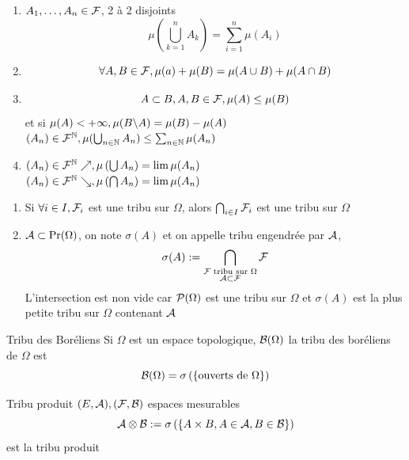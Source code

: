 \documentclass[]{report}
\begin{document}
\begin{prop}{}{}
    \begin{enumerate}[label=\alph*]
        \item $A_1,\ldots,A_n\in \mathcal{F}$, 2 à 2 disjoints
        \[ \mu\left( \bigcup_{k=1}^n A_k\right)= \sum_{i=1}^n \mu (A_i)\]
        \item \[\forall A,B\in \mathcal{F},\mu(a)+\mu(B)=\mu(A\cup B)+ \mu(A\cap B)\]
        \item \[A\subset B, A,B\in \mathcal{F}, \mu(A)\le \mu(B)\]
        et si $\mu(A)<+\infty, \mu(B\backslash A)=\mu(B)-\mu (A)$\\
        $(A_n)\in \mathcal{F}^{\mathbb{N}},\mu(\bigcup_{n\in\mathbb{N}} A_n)\le \sum_{{n\in\mathbb{N}}} \mu(A_n)$
        \item $(A_n)\in \mathcal{F}^{\mathbb{N}} \nearrow,\mu\left(\bigcup A_n\right)=\lim \mu(A_n)$\\
        $(A_n)\in \mathcal{F}^{\mathbb{N}} \searrow,\mu\left(\bigcap A_n\right)=\lim \mu(A_n)$
    \end{enumerate}
\end{prop}

\begin{prop}{}{}
    \begin{enumerate}[label=\alph*]
        \item Si $\forall i\in I,\mathcal{F}_i$ est une tribu sur $\Omega$, alors $\bigcap_{i\in I}\mathcal{F}_i$ est une tribu sur $\Omega$
        \item $\mathcal{A}\subset \Pr(\Omega)$, on note $\sigma(A)$ et on appelle tribu engendrée par $\mathcal{A}$,
        \[\sigma(A):=\bigcap_{\substack{\mathcal{F} \text{ tribu sur $\Omega$}\\  \mathcal{A}\subset \mathcal{F}}} \mathcal{F}\]
        L'intersection est non vide car $\mathcal{P}(\Omega)$ est une tribu sur $\Omega$ et $\sigma(A)$ est la plus petite tribu sur $\Omega$ contenant $\mathcal{A}$
    \end{enumerate}
\end{prop}

\begin{df}{Tribu des Boréliens}{}
    Si $\Omega$ est un espace topologique, $\mathcal{B}(\Omega)$ la tribu des boréliens de $\Omega$ est
    \[\mathcal{B}(\Omega)=\sigma\left(\left\{\text{ouverts de $\Omega$}\right\}\right)\]
\end{df}

\begin{df}{Tribu produit}{}
    $(E,\mathcal{A}),(\mathcal{F},\mathcal{B})$ espaces mesurables
    \[\mathcal{A}\otimes \mathcal{B} := \sigma \left(\left\{A\times B,A\in \mathcal{A},B\in \mathcal{B}\right\}\right)\]
    est la tribu produit
\end{df}
\end{document}
